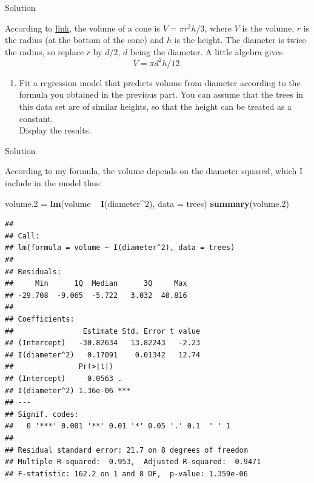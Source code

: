\documentclass[]{tufte-book}
\newenvironment{Shaded}{}{}
\newcommand{\DataTypeTok}[1]{\textcolor[rgb]{0.56,0.13,0.00}{#1}}
\newcommand{\DecValTok}[1]{\textcolor[rgb]{0.25,0.63,0.44}{#1}}
\newcommand{\FloatTok}[1]{\textcolor[rgb]{0.25,0.63,0.44}{#1}}
\newcommand{\KeywordTok}[1]{\textcolor[rgb]{0.00,0.44,0.13}{\textbf{#1}}}
\newcommand{\NormalTok}[1]{#1}
\newcommand{\OperatorTok}[1]{\textcolor[rgb]{0.40,0.40,0.40}{#1}}
\newcommand{\StringTok}[1]{\textcolor[rgb]{0.25,0.44,0.63}{#1}}
\providecommand{\tightlist}{%
  \setlength{\itemsep}{0pt}\setlength{\parskip}{0pt}}
\theoremstyle{definition}
\theoremstyle{definition}
\theoremstyle{definition}
\theoremstyle{remark}
\begin{document}
Solution

According to
\href{http://www.web-formulas.com/Math_Formulas/Geometry_Volume_of_Cone.aspx}{link},
the volume of a cone is \(V=\pi r^2h/3\), where \(V\) is the volume,
\(r\) is the radius (at the bottom of the cone) and \(h\) is the height.
The diameter is twice the radius, so replace \(r\) by \(d/2\), \(d\)
being the diameter. A little algebra gives \[ V = \pi d^2 h / 12.\]

\begin{enumerate}
\def\labelenumi{(\alph{enumi})}
\setcounter{enumi}{7}
\tightlist
\item
  Fit a regression model that predicts volume from diameter according to
  the formula you obtained in the previous part. You can assume that the
  trees in this data set are of similar heights, so that the height can
  be treated as a constant.\\
  Display the results.
\end{enumerate}

Solution

According to my formula, the volume depends on the diameter squared,
which I include in the model thus:

\begin{Shaded}
\begin{Highlighting}[]
\NormalTok{volume}\FloatTok{.2}\NormalTok{ =}\StringTok{ }\KeywordTok{lm}\NormalTok{(volume }\OperatorTok{~}\StringTok{ }\KeywordTok{I}\NormalTok{(diameter}\OperatorTok{^}\DecValTok{2}\NormalTok{), }\DataTypeTok{data =}\NormalTok{ trees)}
\KeywordTok{summary}\NormalTok{(volume}\FloatTok{.2}\NormalTok{)}
\end{Highlighting}
\end{Shaded}

\begin{verbatim}
## 
## Call:
## lm(formula = volume ~ I(diameter^2), data = trees)
## 
## Residuals:
##     Min      1Q  Median      3Q     Max 
## -29.708  -9.065  -5.722   3.032  40.816 
## 
## Coefficients:
##                Estimate Std. Error t value
## (Intercept)   -30.82634   13.82243   -2.23
## I(diameter^2)   0.17091    0.01342   12.74
##               Pr(>|t|)    
## (Intercept)     0.0563 .  
## I(diameter^2) 1.36e-06 ***
## ---
## Signif. codes:  
##   0 '***' 0.001 '**' 0.01 '*' 0.05 '.' 0.1  ' ' 1
## 
## Residual standard error: 21.7 on 8 degrees of freedom
## Multiple R-squared:  0.953,  Adjusted R-squared:  0.9471 
## F-statistic: 162.2 on 1 and 8 DF,  p-value: 1.359e-06
\end{verbatim}
\end{document}

